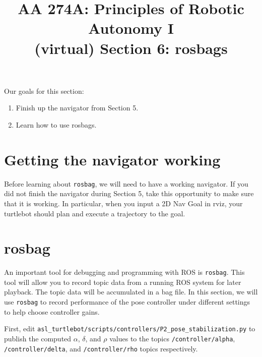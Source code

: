 \documentclass{article}
\title{AA 274A: Principles of Robotic Autonomy I \\(virtual) Section 6: rosbags}
\date{}
\begin{document}
\maketitle
\pagestyle{fancy}
\vspace{-1.25cm}
Our goals for this section: 
\begin{enumerate}
    \item Finish up the navigator from Section 5.
    \item Learn how to use rosbags.
\end{enumerate}


\section{Getting the navigator working}
Before learning about \texttt{rosbag}, we will need to have a working navigator. If you did not finish the navigator during Section 5, take this opportunity to make sure that it is working. In particular, when you input a 2D Nav Goal in rviz, your turtlebot should plan and execute a trajectory to the goal.

\section{rosbag}
An important tool for debugging and programming with ROS is \texttt{rosbag}. This tool will allow you to record topic data from a running ROS system for later playback. The topic data will be accumulated in a bag file. In this section, we will use \texttt{rosbag} to record performance of the pose controller under different settings to help choose controller gains.

First, edit \texttt{asl\_turtlebot/scripts/controllers/P2\_pose\_stabilization.py} to publish the computed $\alpha$, $\delta$, and $\rho$ values to the topics \texttt{/controller/alpha}, \texttt{/controller/delta}, and \texttt{/controller/rho} topics respectively. 
\end{document}

